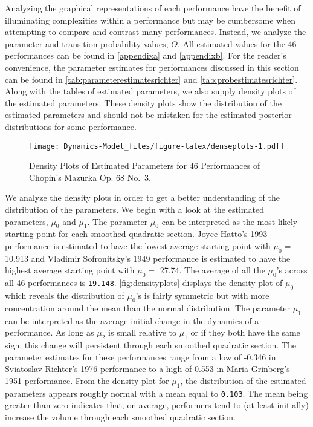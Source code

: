 \documentclass[12pt]{article}
\begin{document}
Analyzing the graphical representations of each performance have the
benefit of illuminating complexities within a performance but may be
cumbersome when attempting to compare and contrast many performances.
Instead, we analyze the parameter and transition probability values,
\(\Theta\). All estimated values for the 46 performances can be found in
\autoref{appendixa} and \autoref{appendixb}. For the reader's
convenience, the parameter estimates for performances discussed in this
section can be found in \autoref{tab:parameterestimatesrichter} and
\autoref{tab:probestimatesrichter}. Along with the tables of estimated
parameters, we also supply density plots of the estimated parameters.
These density plots show the distribution of the estimated parameters
and should not be mistaken for the estimated posterior distributions for
some performance.

\begin{figure}
\centering
\texttt{[image: Dynamics-Model\_files/figure-latex/denseplots-1.pdf]}
\caption{\label{fig:densityplots}Density Plots of Estimated Parameters
for 46 Performances of Chopin's Mazurka Op. 68 No.~3.}
\end{figure}

We analyze the density plots in order to get a better understanding of
the distribution of the parameters. We begin with a look at the
estimated parameters, \(\mu_{0}\) and \(\mu_1\). The parameter \(\mu_0\)
can be interpreted as the most likely starting point for each smoothed
quadratic section. Joyce Hatto's 1993 performance is estimated to have
the lowest average starting point with \(\mu_0=\) 10.913 and Vladimir
Sofronitsky's 1949 performance is estimated to have the highest average
starting point with \(\mu_0=\) 27.74. The average of all the \(\mu_0\)'s
across all 46 performances is \texttt{19.148}.
\autoref{fig:densityplots} displays the density plot of \(\mu_0\) which
reveals the distribution of \(\mu_0\)'s is fairly symmetric but with
more concentration around the mean than the normal distribution. The
parameter \(\mu_1\) can be interpreted as the average initial change in
the dynamics of a performance. As long as \(\mu_2\) is small relative to
\(\mu_1\) or if they both have the same sign, this change will
persistent through each smoothed quadratic section. The parameter
estimates for these performances range from a low of -0.346 in
Sviatoslav Richter's 1976 performance to a high of 0.553 in Maria
Grinberg's 1951 performance. From the density plot for \(\mu_1\), the
distribution of the estimated parameters appears roughly normal with a
mean equal to \texttt{0.103}. The mean being greater than zero indicates
that, on average, performers tend to (at least initially) increase the
volume through each smoothed quadratic section.
\end{document}
